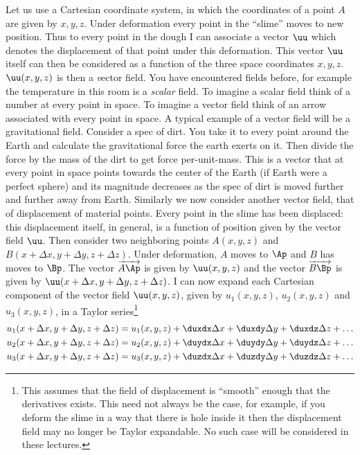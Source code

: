 Let us use a Cartesian coordinate system, in which the coordinates of 
a point $A$ are given by $x,y,z$. Under deformation every point in the
``slime'' moves to new position. Thus to every point in the dough I
can associate a vector $\uu$ which denotes the displacement of that
point under this deformation. This vector $\uu$ itself can then be
considered as a function of the three space coordinates
$x,y,z$. $\uu(x,y,z)$ is then a {\textit vector field}. 
You have encountered fields before, for example the temperature in
this room is a {\it scalar} field.  To imagine a scalar field think of
a number at every point in space. To imagine a vector field think of
an arrow associated with every point in space. A typical example of a
vector field will be a gravitational field. Consider a spec of
dirt. You take it to every point around the Earth and calculate the
gravitational force the earth exerts on it. Then divide the force by
the mass of the dirt to get force per-unit-mass. This is a vector that at
every point in space points towards the center of the Earth (if
Earth were a perfect sphere) and its magnitude decreases as the spec
of dirt is moved further and further away from Earth. Similarly we now
consider another vector field, that of displacement of material
points. Every point in the slime has been displaced: this displacement
itself, in general, is a function of position given by the vector field
$\uu$. Then consider two neighboring points $A(x,y,z)$ and
$B(x+\Delta x, y+\Delta y, z+\Delta z)$. Under deformation, $A$ 
moves to $\Ap$ and $B$ has moves to $\Bp$.
The vector $\overrightarrow{A\Ap}$ is given
by $\uu(x,y,z)$ and the vector $\overrightarrow{B\Bp}$ is given by $\uu(x+\Delta x,
y+\Delta y, z+\Delta z)$.  I can now expand each Cartesian component of the
vector field $\uu(x,y,z)$, given by $u_1(x,y,z)$, $u_2(x,y,z)$ and
$u_3(x,y,z)$, in a Taylor series\footnote{ This assumes that the field
  of displacement is ``smooth'' enough that the derivatives
  exists. This need not always be the case, for example,  if
  you deform the slime in a way that there is hole inside it then 
the displacement field may no longer be Taylor expandable. No such
case will be considered in these lectures. }
\begin{subequations}
\begin{align}
u_1(x+\Delta x, y+\Delta y, z+\Delta z) &= u_1(x,y,z) + \duxdx\Delta x
  + \duxdy \Delta y + \duxdz \Delta z + \ldots  \label{eq:ux}\\
u_2(x+\Delta x, y+\Delta y, z+\Delta z) &= u_2(x,y,z) + \duydx\Delta x
  + \duydy \Delta y + \duydz \Delta z + \ldots \label{eq:uy}\\
u_3(x+\Delta x, y+\Delta y, z+\Delta z) &= u_3(x,y,z) + \duzdx\Delta x
  + \duzdy \Delta y + \duzdz \Delta z + \ldots 
\end{align}
\label{eq:uu}
\end{subequations}
